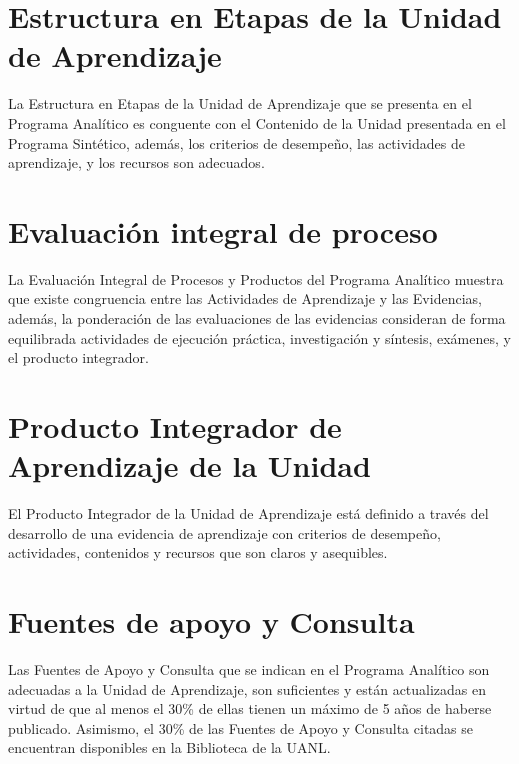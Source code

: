 \documentclass{article}
\newcounter{boxcount}
\newcommand{\sino}{\hfill \CheckBox[name=yesbox\refstepcounter{boxcount},checkboxsymbol=\ding{56}]{S\'{i}}%
  \quad%
  \CheckBox[name=nobox\refstepcounter{boxcount},checkboxsymbol=\ding{56}]{No}}
\newcommand{\rsino}{\begin{flushright}\sino\end{flushright}}
\begin{document}
\begin{Form}
\newpage

\section{Estructura en Etapas de la Unidad de Aprendizaje}

La Estructura en Etapas de la Unidad de Aprendizaje que se presenta en el Programa
Anal\'{i}tico es conguente con el Contenido de la Unidad presentada en el Programa Sint\'{e}tico,
adem\'{a}s, los criterios de desempe\~{n}o, las actividades de aprendizaje, y los recursos son
adecuados. \sino

\section{Evaluaci\'{o}n integral de proceso}

La Evaluaci\'{o}n Integral de Procesos y Productos del Programa Anal\'{i}tico muestra que existe
congruencia entre las Actividades de Aprendizaje y las Evidencias, adem\'{a}s, la ponderaci\'{o}n
de las evaluaciones de las evidencias consideran de forma equilibrada actividades de
ejecuci\'{o}n pr\'{a}ctica, investigaci\'{o}n y s\'{i}ntesis, ex\'{a}menes, y el producto integrador. \sino

\section{Producto Integrador de Aprendizaje de la Unidad}

El Producto Integrador de la Unidad de Aprendizaje est\'{a} definido a trav\'{e}s del desarrollo de
una evidencia de aprendizaje con criterios de desempe\~{n}o, actividades, contenidos y
recursos que son claros y asequibles. \sino

\section{Fuentes de apoyo y Consulta}

Las Fuentes de Apoyo y Consulta que se indican en el Programa Anal\'{i}tico son adecuadas a
la Unidad de Aprendizaje, son suficientes y est\'{a}n actualizadas en virtud de que al menos el
30\% de ellas tienen un m\'{a}ximo de 5 a\~{n}os de haberse publicado. Asimismo, el 30\% de las
Fuentes de Apoyo y Consulta citadas se encuentran disponibles en la Biblioteca de la
UANL. \rsino


\end{Form}
\end{document}
